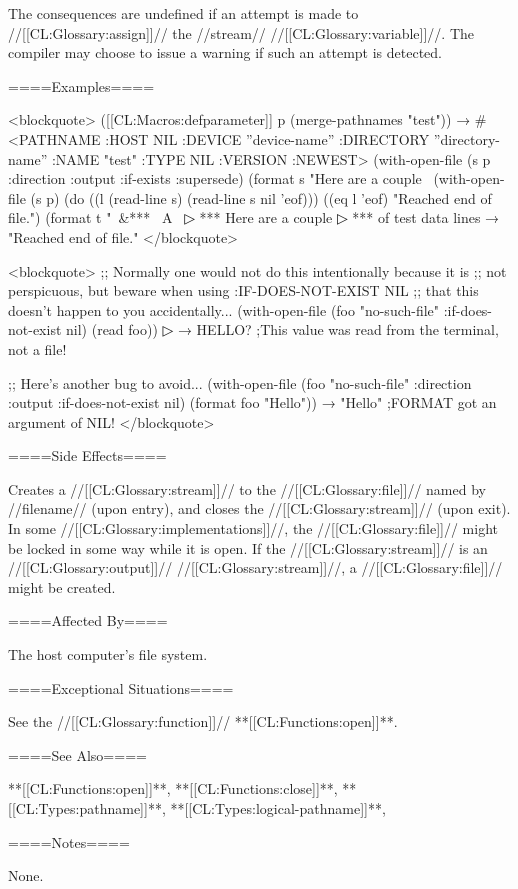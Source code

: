 The consequences are undefined if an attempt is made to //[[CL:Glossary:assign]]// the //stream// //[[CL:Glossary:variable]]//. The compiler may choose to issue a warning if such an attempt is detected.

====Examples====

<blockquote> ([[CL:Macros:defparameter]] p (merge-pathnames "test")) → #<PATHNAME :HOST NIL :DEVICE ''device-name'' :DIRECTORY ''directory-name'' :NAME "test" :TYPE NIL :VERSION :NEWEST> (with-open-file (s p :direction :output :if-exists :supersede) (format s "Here are a couple~ (with-open-file (s p) (do ((l (read-line s) (read-line s nil 'eof))) ((eq l 'eof) "Reached end of file.") (format t "~&*** ~A~
▷ *** Here are a couple
▷ *** of test data lines → "Reached end of file." </blockquote>

<blockquote> ;; Normally one would not do this intentionally because it is ;; not perspicuous, but beware when using :IF-DOES-NOT-EXIST NIL ;; that this doesn't happen to you accidentally... (with-open-file (foo "no-such-file" :if-does-not-exist nil) (read foo))
▷  → HELLO? ;This value was read from the terminal, not a file!

;; Here's another bug to avoid... (with-open-file (foo "no-such-file" :direction :output :if-does-not-exist nil) (format foo "Hello")) → "Hello" ;FORMAT got an argument of NIL! </blockquote>

====Side Effects====

Creates a //[[CL:Glossary:stream]]// to the //[[CL:Glossary:file]]// named by //filename// (upon entry), and closes the //[[CL:Glossary:stream]]// (upon exit). In some //[[CL:Glossary:implementations]]//, the //[[CL:Glossary:file]]// might be locked in some way while it is open. If the //[[CL:Glossary:stream]]// is an //[[CL:Glossary:output]]// //[[CL:Glossary:stream]]//, a //[[CL:Glossary:file]]// might be created.

====Affected By====

The host computer's file system.

====Exceptional Situations====

See the //[[CL:Glossary:function]]// **[[CL:Functions:open]]**.

====See Also====

**[[CL:Functions:open]]**, **[[CL:Functions:close]]**, **[[CL:Types:pathname]]**, **[[CL:Types:logical-pathname]]**, {\secref\PathnamesAsFilenames}

====Notes====

None.

           
